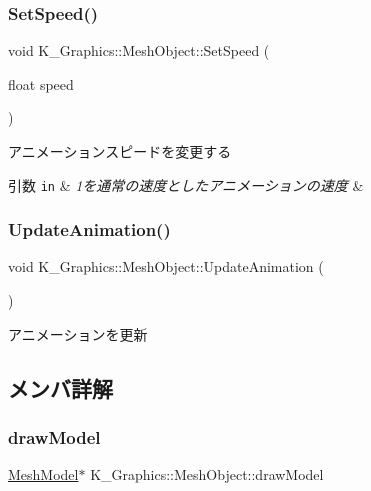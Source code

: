 \subsubsection{\texorpdfstring{Set\+Speed()}{SetSpeed()}}
{\footnotesize\ttfamily void K\+\_\+\+Graphics\+::\+Mesh\+Object\+::\+Set\+Speed (\begin{DoxyParamCaption}\item[{float}]{speed }\end{DoxyParamCaption})}



アニメーションスピードを変更する 


\begin{DoxyParams}[1]{引数}
\mbox{\tt in}  & {\em 1を通常の速度としたアニメーションの速度} & \\
\hline
\end{DoxyParams}
\mbox{\label{class_k___graphics_1_1_mesh_object_a0e4446fa8a0b979d488210bca87df41a}} 
\subsubsection{\texorpdfstring{Update\+Animation()}{UpdateAnimation()}}
{\footnotesize\ttfamily void K\+\_\+\+Graphics\+::\+Mesh\+Object\+::\+Update\+Animation (\begin{DoxyParamCaption}{ }\end{DoxyParamCaption})}



アニメーションを更新 



\subsection{メンバ詳解}
\mbox{\label{class_k___graphics_1_1_mesh_object_a3691b447ef31ac253864166711b87ea7}} 
\subsubsection{\texorpdfstring{draw\+Model}{drawModel}}
{\footnotesize\ttfamily \mbox{\hyperlink{class_k___graphics_1_1_mesh_model}{Mesh\+Model}}$\ast$ K\+\_\+\+Graphics\+::\+Mesh\+Object\+::draw\+Model\hspace{0.3cm}{\ttfamily [protected]}}

